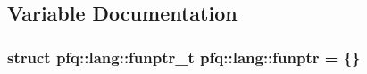 \subsection{Variable Documentation}
\hypertarget{namespacepfq_1_1lang_a8d957b8f6df7198413d3ff9bd698e682}{
\subsubsection[{funptr}]{\setlength{\rightskip}{0pt plus 5cm}struct {\bf pfq\+::lang\+::funptr\+\_\+t}  pfq\+::lang\+::funptr = \{\}}}\label{namespacepfq_1_1lang_a8d957b8f6df7198413d3ff9bd698e682}
